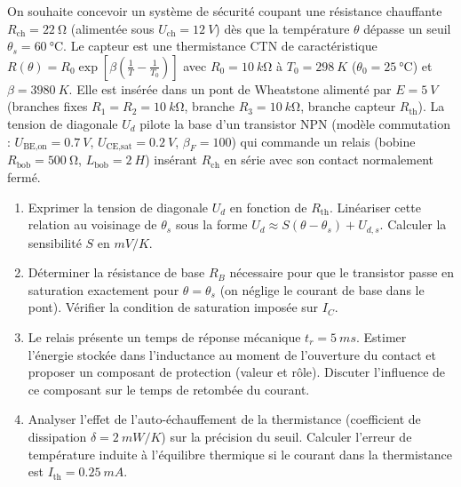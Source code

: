 \documentclass[11pt]{article}
\begin{document}
\begin{exercice}
On souhaite concevoir un système de sécurité coupant une résistance chauffante $R_{\text{ch}} = \SI{22}{\ohm}$ (alimentée sous $U_{\text{ch}} = \SI{12}{V}$) dès que la température $\theta$ dépasse un seuil $\theta_s = \SI{60}{\celsius}$. Le capteur est une thermistance CTN de caractéristique $R(\theta) = R_0 \exp\left[\beta\left(\frac{1}{T} - \frac{1}{T_0}\right)\right]$ avec $R_0 = \SI{10}{k\ohm}$ à $T_0 = \SI{298}{K}$ ($\theta_0 = \SI{25}{\celsius}$) et $\beta = \SI{3980}{K}$. Elle est insérée dans un pont de Wheatstone alimenté par $E = \SI{5}{V}$ (branches fixes $R_1 = R_2 = \SI{10}{k\ohm}$, branche $R_3 = \SI{10}{k\ohm}$, branche capteur $R_{\text{th}}$). La tension de diagonale $U_d$ pilote la base d'un transistor NPN (modèle commutation : $U_{\text{BE,on}} = \SI{0,7}{V}$, $U_{\text{CE,sat}} = \SI{0,2}{V}$, $\beta_F = 100$) qui commande un relais (bobine $R_{\text{bob}} = \SI{500}{\ohm}$, $L_{\text{bob}} = \SI{2}{H}$) insérant $R_{\text{ch}}$ en série avec son contact normalement fermé.
\begin{enumerate}
    \item Exprimer la tension de diagonale $U_d$ en fonction de $R_{\text{th}}$. Linéariser cette relation au voisinage de $\theta_s$ sous la forme $U_d \approx S (\theta - \theta_s) + U_{d,s}$. Calculer la sensibilité $S$ en $\si{mV/K}$.
    \item Déterminer la résistance de base $R_B$ nécessaire pour que le transistor passe en saturation exactement pour $\theta = \theta_s$ (on néglige le courant de base dans le pont). Vérifier la condition de saturation imposée sur $I_C$.
    \item Le relais présente un temps de réponse mécanique $t_r = \SI{5}{ms}$. Estimer l'énergie stockée dans l'inductance au moment de l'ouverture du contact et proposer un composant de protection (valeur et rôle). Discuter l'influence de ce composant sur le temps de retombée du courant.
    \item Analyser l'effet de l'auto-échauffement de la thermistance (coefficient de dissipation $\delta = \SI{2}{mW/K}$) sur la précision du seuil. Calculer l'erreur de température induite à l'équilibre thermique si le courant dans la thermistance est $I_{\text{th}} = \SI{0,25}{mA}$.
\end{enumerate}
\end{exercice}
\end{document}
